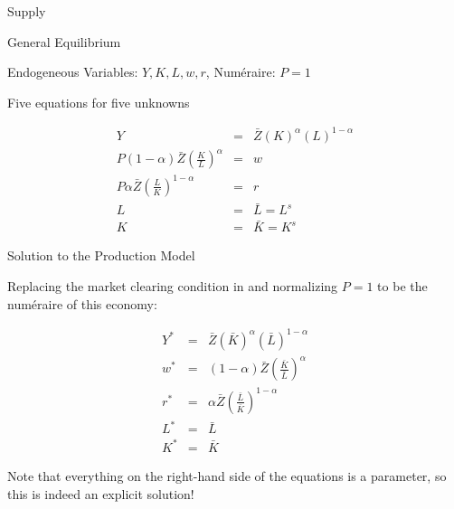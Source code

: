 \documentclass[notes,11pt, aspectratio=169, xcolor=table]{beamer}
\begin{document}
\begin{frame}{Supply}
\begin{figure}[htbp!]
\begin{subfigure}{}
{
}

\end{subfigure}

\end{figure}
\end{frame}


\begin{frame}{General Equilibrium}

\Large{Endogeneous Variables: $Y, K, L, w, r$, \quad Num\'eraire: $P=1$}

\vspace{20pt}

\normalsize Five equations for five unknowns

  \begin{eqnarray}
    Y &=& \bar{Z} (K)^{\alpha} (L)^{1-\alpha} \\
    P (1-\alpha) \bar{Z} \left( \frac{K}{L} \right)^\alpha  &=& w \\
    P \alpha \bar{Z} \left( \frac{L}{K} \right)^{1-\alpha}  &=& r  \\
     L &=& \bar{L} = L^s  \\
     K &=& \bar{K} = K^s
  \end{eqnarray}

\end{frame}

\begin{frame}{Solution to the Production Model}

Replacing the market clearing condition in and normalizing $P=1$ to be the num\'eraire of this economy:

  \begin{eqnarray}
    Y^* &=& \bar{Z} (\bar{K})^{\alpha} (\bar{L})^{1-\alpha} \\
    w^* &=& (1-\alpha) \bar{Z} \left( \frac{\bar{K}}{\bar{L}} \right)^\alpha  \\
     r^* &=&  \alpha \bar{Z} \left( \frac{\bar{L}}{\bar{K}} \right)^{1-\alpha}  \\
     L^* &=& \bar{L}  \\
     K^* &=& \bar{K}
  \end{eqnarray}

Note that everything on the right-hand side of the equations is a parameter, so this is indeed an explicit solution!
\end{frame}
\end{document}
